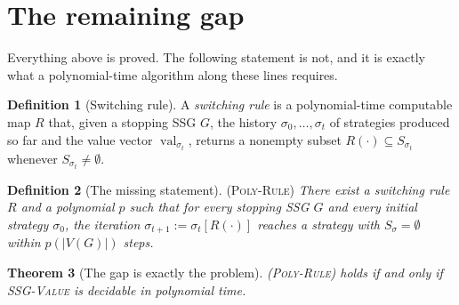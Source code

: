 \documentclass[11pt]{article}
\theoremstyle{plain}
\newtheorem{theorem}{Theorem}[section]
\theoremstyle{definition}
\newtheorem{definition}[theorem]{Definition}
\DeclareMathOperator{\val}{val}
\begin{document}
\section{The remaining gap}\label{sec:gap}

Everything above is proved. The following statement is not, and it is
exactly what a polynomial-time algorithm along these lines requires.

\begin{definition}[Switching rule]\label{def:rule}
A \emph{switching rule} is a polynomial-time computable map $R$ that,
given a stopping SSG $G$, the history $\sigma_0,\dots,\sigma_t$ of
strategies produced so far and the value vector $\val_{\sigma_t}$,
returns a nonempty subset $R(\cdot)\subseteq S_{\sigma_t}$ whenever
$S_{\sigma_t}\ne\emptyset$.
\end{definition}

\begin{definition}[The missing statement]\label{def:missing}
\textsc{(Poly-Rule)} \emph{There exist a switching rule $R$ and a
polynomial $p$ such that for every stopping SSG $G$ and every initial
strategy $\sigma_0$, the iteration $\sigma_{t+1}:=\sigma_t[R(\cdot)]$
reaches a strategy with $S_\sigma=\emptyset$ within $p(|V(G)|)$ steps.}
\end{definition}

\begin{theorem}[The gap is exactly the problem]\label{thm:gap-equivalence}
\textsc{(Poly-Rule)} holds if and only if \textsc{SSG-Value} is decidable
in polynomial time.
\end{theorem}
\end{document}
